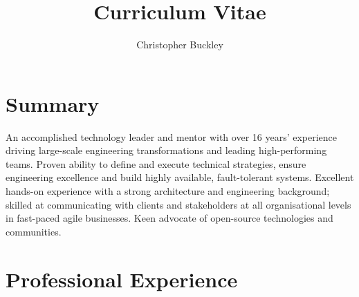 \documentclass{cv}
\title{Curriculum Vitae}
\author{Christopher Buckley}
\begin{document}

\section{Summary}

An accomplished technology leader and mentor with over 16 years' experience driving large-scale
engineering transformations and leading high-performing teams. Proven ability to define and execute
technical strategies, ensure engineering excellence and build highly available, fault-tolerant
systems.  Excellent hands-on experience with a strong architecture and engineering background;
skilled at communicating with clients and stakeholders at all organisational levels in fast-paced
agile businesses. Keen advocate of open-source technologies and communities.


\section{Professional Experience}
\end{document}
